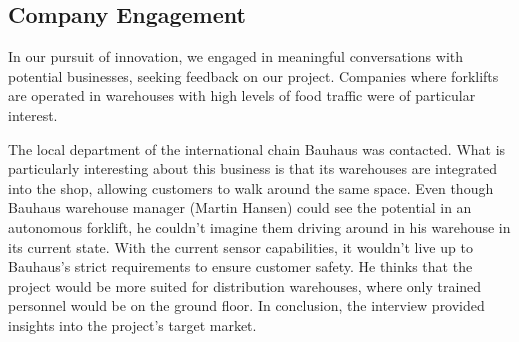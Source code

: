 \documentclass[../report.tex]{subfiles}
\begin{document}
\subsection{Company Engagement}
In our pursuit of innovation, we engaged in meaningful conversations with
potential businesses, seeking feedback on our project. Companies where
forklifts are operated in warehouses with high levels of food traffic were of
particular interest.

The local department of the international chain Bauhaus was contacted. What is
particularly interesting about this business is that its warehouses are
integrated into the shop, allowing customers to walk around the same space.
Even though Bauhaus warehouse manager (Martin Hansen) could see the potential in
an autonomous forklift, he couldn't imagine them driving around in his
warehouse in its current state. With the current sensor capabilities, it
wouldn't live up to Bauhaus's strict requirements to ensure customer safety. He
thinks that the project would be more suited for distribution warehouses, where
only trained personnel would be on the ground floor. In conclusion, the
interview provided insights into the project's target market.
\end{document}
